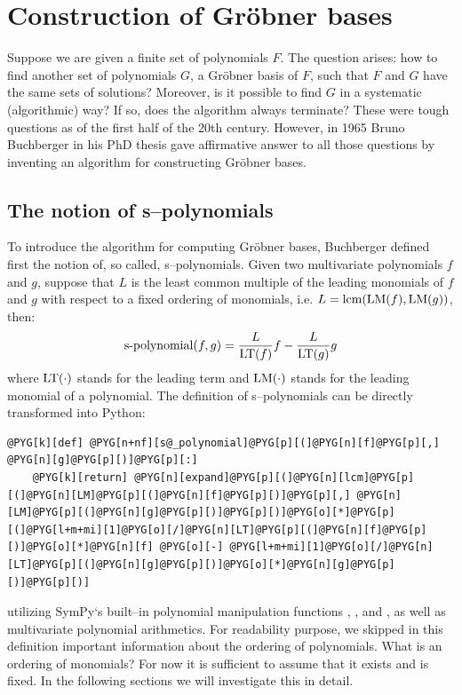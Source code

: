 \section{Construction of Gröbner bases}\label{gb-construct}

Suppose we are given a finite set of polynomials $F$. The question arises: how to find another set
of polynomials $G$, a Gröbner basis of $F$, such that $F$ and $G$ have the same sets of solutions?
Moreover, is it possible to find $G$ in a systematic (algorithmic) way? If so, does the algorithm
always terminate? These were tough questions as of the first half of the 20th century. However, in
1965 Bruno Buchberger in his PhD thesis gave affirmative answer to all those questions by inventing
an algorithm for constructing Gröbner bases.


\subsection{The notion of s--polynomials}

To introduce the algorithm for computing Gröbner bases, Buchberger defined first the notion of,
so called, s--polynomials. Given two multivariate polynomials $f$ and $g$, suppose that $L$ is the
least common multiple of the leading monomials of $f$ and $g$ with respect to a fixed ordering of
monomials, i.e. $L = \operatorname{lcm}(\operatorname{LM}(f), \operatorname{LM}(g))$, then:
\begin{gather}
\begin{split}\operatorname{s-polynomial}(f, g) = \frac{L}{\operatorname{LT}(f)} f - \frac{L}{\operatorname{LT}(g)} g\end{split}\notag
\end{gather}
where $\operatorname{LT}(\cdot)$ stands for the leading term and $\operatorname{LM}(\cdot)$ stands for the leading monomial of
a polynomial. The definition of s--polynomials can be directly transformed into Python:

\begin{Verbatim}[commandchars=@\[\]]
@PYG[k][def] @PYG[n+nf][s@_polynomial]@PYG[p][(]@PYG[n][f]@PYG[p][,] @PYG[n][g]@PYG[p][)]@PYG[p][:]
    @PYG[k][return] @PYG[n][expand]@PYG[p][(]@PYG[n][lcm]@PYG[p][(]@PYG[n][LM]@PYG[p][(]@PYG[n][f]@PYG[p][)]@PYG[p][,] @PYG[n][LM]@PYG[p][(]@PYG[n][g]@PYG[p][)]@PYG[p][)]@PYG[o][*]@PYG[p][(]@PYG[l+m+mi][1]@PYG[o][/]@PYG[n][LT]@PYG[p][(]@PYG[n][f]@PYG[p][)]@PYG[o][*]@PYG[n][f] @PYG[o][-] @PYG[l+m+mi][1]@PYG[o][/]@PYG[n][LT]@PYG[p][(]@PYG[n][g]@PYG[p][)]@PYG[o][*]@PYG[n][g]@PYG[p][)]@PYG[p][)]
\end{Verbatim}
\noindent
utilizing SymPy`s built--in polynomial manipulation functions , , 
and , as well as multivariate polynomial arithmetics. For readability purpose, we
skipped in this definition important information about the ordering of polynomials. What is an
ordering of monomials? For now it is sufficient to assume that it exists and is fixed. In the
following sections we will investigate this in detail.


